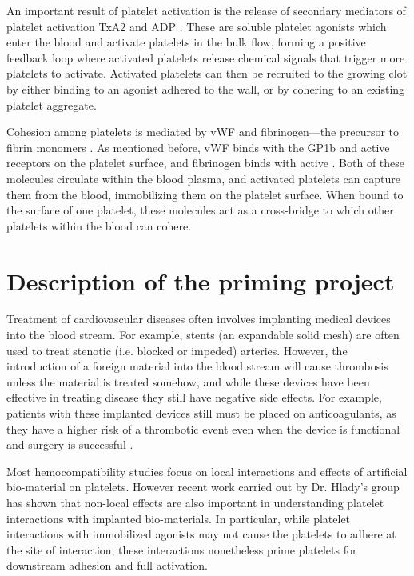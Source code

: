 An important result of platelet activation is the release of secondary
mediators of platelet activation TxA2 and ADP \cite{Bye2016}. These
are soluble platelet agonists which enter the blood and activate
platelets in the bulk flow, forming a positive feedback loop where
activated platelets release chemical signals that trigger more
platelets to activate. Activated platelets can then be recruited to
the growing clot by either binding to an agonist adhered to the wall,
or by cohering to an existing platelet aggregate.

Cohesion among platelets is mediated by vWF and fibrinogen---the
precursor to fibrin monomers \cite{Fogelson2015}. As mentioned before,
vWF binds with the GP1b and active  receptors on the
platelet surface, and fibrinogen binds with active
. Both of these molecules circulate within the blood
plasma, and activated platelets can capture them from the blood,
immobilizing them on the platelet surface. When bound to the surface
of one platelet, these molecules act as a cross-bridge to which other
platelets within the blood can cohere.

\section{Description of the priming project}
\label{sec:priming-project}

Treatment of cardiovascular diseases often involves implanting medical
devices into the blood stream. For example, stents (an expandable
solid mesh) are often used to treat stenotic (i.e. blocked or impeded)
arteries. However, the introduction of a foreign material into the
blood stream will cause thrombosis unless the material is treated
somehow, and while these devices have been effective in treating
disease they still have negative side effects. For example, patients
with these implanted devices still must be placed on anticoagulants,
as they have a higher risk of a thrombotic event even when the device
is functional and surgery is successful \cite{Cannegieter1994}.

Most hemocompatibility studies focus on local interactions and effects
of artificial bio-material on platelets. However recent work
\cite{Corum2011,Corum2012} carried out by Dr. Hlady's group has shown
that non-local effects are also important in understanding platelet
interactions with implanted bio-materials. In particular, while
platelet interactions with immobilized agonists may not cause the
platelets to adhere at the site of interaction, these interactions
nonetheless prime platelets for downstream adhesion and full
activation.


